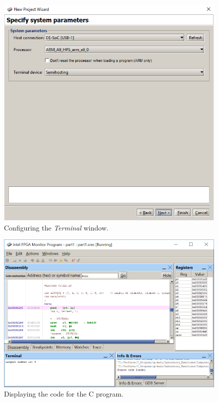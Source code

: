 \documentclass[epsfig,10pt,fullpage]{article}
\begin{document}
\begin{enumerate}
\begin{figure}[H]
	\begin{center}
	\includegraphics[scale=0.58]{figures/figureMP_terminal.png}
	\end{center}
	\vspace{-0.25cm}\caption{Configuring the {\it Terminal} window.}
\label{fig:MPterminal}
\end{figure}


\begin{figure}[H]
	\begin{center}
	\includegraphics[scale=0.8]{figures/figureMP_goto.png}
	\end{center}
	\caption{Displaying the code for the C program.}
\label{fig:MPgoto}
\end{figure}

\end{enumerate}
\end{document}
